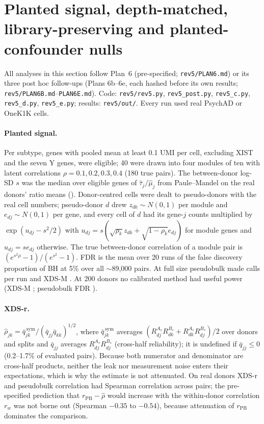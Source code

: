 \section{Planted signal, depth-matched, library-preserving and planted-confounder nulls}\label{app:plan6}

All analyses in this section follow Plan~6 (pre-specified; \texttt{rev5/PLAN6.md}) or its three post hoc follow-ups (Plans 6b--6e, each hashed before its own results; \texttt{rev5/PLAN6B.md}--\texttt{PLAN6E.md}). Code: \texttt{rev5/rev5.py}, \texttt{rev5\_post.py}, \texttt{rev5\_c.py}, \texttt{rev5\_d.py}, \texttt{rev5\_e.py}; results: \texttt{rev5/out/}. Every run used real PsychAD or OneK1K cells.

\paragraph{Planted signal.} Per subtype, genes with pooled mean at least 0.1 UMI per cell, excluding XIST and the seven Y genes, were eligible; 40 were drawn into four modules of ten with latent correlations $\rho=0.1,0.2,0.3,0.4$ (180 true pairs). The between-donor log-SD $s$ was the median over eligible genes of $\hat\tau_j/\hat\mu_j$ from Paule--Mandel on the real donors' ratio means (\SpS). Donor-centred cells were dealt to pseudo-donors with the real cell numbers; pseudo-donor $d$ drew $z_{dk}\sim N(0,1)$ per module and $e_{dj}\sim N(0,1)$ per gene, and every cell of $d$ had its gene-$j$ counts multiplied by $\exp(u_{dj}-s^2/2)$ with $u_{dj}=s(\sqrt{\rho_k}z_{dk}+\sqrt{1-\rho_k}e_{dj})$ for module genes and $u_{dj}=se_{dj}$ otherwise. The true between-donor correlation of a module pair is $(e^{s^2\rho}-1)/(e^{s^2}-1)$. FDR is the mean over 20 runs of the false discovery proportion of BH at 5\% over all $\sim$89{,}000 pairs. At full size pseudobulk made \SpPBcalls{} calls per run and XDS-M \SpXcalls. At 200 donors no calibrated method had useful power (XDS-M \SpXpowTwo; pseudobulk FDR \SpPBfdrTwo).

\paragraph{XDS-r.} $\widehat{\rho}_{jk}=\bar q^{\,\mathrm{sym}}_{jk}/(\bar q_{jj}\bar q_{kk})^{1/2}$, where $\bar q^{\,\mathrm{sym}}_{jk}$ averages $(R^{A_s}_{dj}R^{B_s}_{dk}+R^{A_s}_{dk}R^{B_s}_{dj})/2$ over donors and splits and $\bar q_{jj}$ averages $R^{A_s}_{dj}R^{B_s}_{dj}$ (cross-half reliability); it is undefined if $\bar q_{jj}\le0$ (0.2--1.7\% of evaluated pairs). Because both numerator and denominator are cross-half products, neither the leak nor measurement noise enters their expectations, which is why the estimate is not attenuated. On real donors XDS-r and pseudobulk correlation had Spearman correlation \XrSpear{} across pairs; the pre-specified prediction that $r_{\mathrm{PB}}-\widehat\rho$ would increase with the within-donor correlation $r_w$ was not borne out (Spearman $-0.35$ to $-0.54$), because attenuation of $r_{\mathrm{PB}}$ dominates the comparison.

